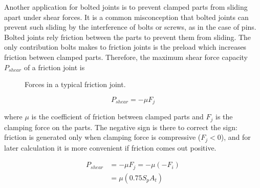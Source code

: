 \documentclass[
10pt,
a4paper,
openany,
svgnames,
]{book}
\begin{document}
Another application for bolted joints is to prevent clamped parts from sliding apart under shear forces. It is a common misconception that bolted joints can prevent such sliding by the interference of bolts or screws, as in the case of pins. Bolted joints rely friction between the parts to prevent them from sliding. The only contribution bolts makes to friction joints is the preload which increases friction between clamped parts. Therefore, the maximum shear force capacity $P_{shear}$ of a friction joint is

\begin{figure}[h]
  \centering
  \caption{Forces in a typical friction joint.}
\end{figure}

\[P_{shear} = -\mu F_j\]

where $\mu$ is the coefficient of friction between clamped parts and $F_j$ is the clamping force on the parts. The negative sign is there to correct the sign: friction is generated only when clamping force is compressive ($F_j < 0$), and for later calculation it is more convenient if friction comes out positive.

\begin{align*}
  P_{shear} &= -\mu F_j = -\mu \left(  - F_i \right) \\
            &= \mu (0.75S_pA_t)
\end{align*}
\end{document}
